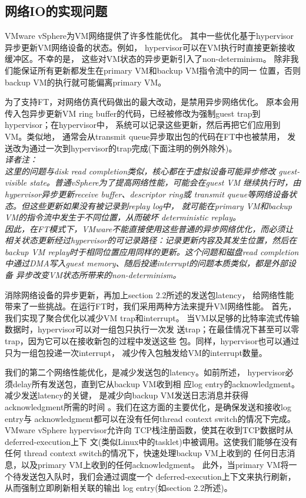\subsection{网络IO的实现问题}

VMware vSphere为VM网络提供了许多性能优化。%
其中一些优化基于hypervisor异步更新VM网络设备的状态。例如，%
hypervisor可以在VM执行时直接更新接收缓冲区。不幸的是，%
这些对VM状态的异步更新引入了non-determinism。%
除非我们能保证所有更新都发生在primary VM和backup VM指令流中的同一%
位置，否则backup VM的执行就可能偏离primary VM。%

为了支持FT，对网络仿真代码做出的最大改动，是禁用异步网络优化。%
原本会用传入包异步更新VM ring buffer的代码，已经被修改为强制guest %
trap到hypervisor；在hypervisor中，%
系统可以记录这些更新，然后再把它们应用到VM。类似地，%
通常会从transmit queue异步取出包的代码在FT中也被禁用，%
发送改为通过一次到hypervisor的trap完成(下面注明的例外除外)。%
\\\emph{译者注：
\\
这里的问题与disk read completion类似，核心都在于虚拟设备可能异步修改
guest-visible state。普通vSphere为了提高网络性能，可能会在guest VM
继续执行时，由hypervisor异步更新receive buffer、descriptor ring或
transmit queue等网络设备状态。但这些更新如果没有被记录到replay log中，
就可能在primary VM和backup VM的指令流中发生于不同位置，从而破坏
deterministic replay。
\\因此，在FT模式下，VMware不能直接使用这些普通的异步网络优化，而必须让
相关状态更新经过hypervisor的可记录路径：记录更新内容及其发生位置，然后在
backup VM replay时于相同位置应用同样的更新。这个问题和磁盘read completion
中通过DMA写入guest memory、随后投递interrupt的问题本质类似，都是外部设备
异步改变VM状态所带来的non-determinism。}

消除网络设备的异步更新，再加上section 2.2所述的发送包latency，%
给网络性能带来了一些挑战。在运行FT时，我们采用两种方法来提升VM网络性能。%
首先，我们实现了聚合优化以减少VM trap和interrupt。%
当VM以足够的比特率流式传输数据时，hypervisor可以对一组包只执行一次发%
送trap；在最佳情况下甚至可以零trap，因为它可以在接收新包的过程中发送这些%
包。同样，hypervisor也可以通过只为一组包投递一次interrupt，%
减少传入包触发给VM的interrupt数量。%

我们的第二个网络性能优化，是减少发送包的latency。如前所述，%
hypervisor必须delay所有发送包，直到它从backup VM收到相%
应log entry的acknowledgment。减少发送latency的关键，%
是减少向backup VM发送日志消息并获得acknowledgment所需的时间%
。我们在这方面的主要优化，是确保发送和接收log entry与%
acknowledgment都可以在没有任何thread context %
switch的情况下完成。VMware vSphere hypervisor允许向%
TCP栈注册函数，使其在收到TCP数据时从deferred-execution上下%
文(类似Linux中的tasklet)中被调用。这使我们能够在没有任何%
thread context switch的情况下，快速处理backup VM上收到的%
任何日志消息，以及primary VM上收到的任何acknowledgment。%
此外，当primary VM将一个待发送包入队时，我们会通过调度一个%
deferred-execution上下文来执行刷新，从而强制立即刷新相关联的输出%
log entry(如section 2.2所述)。
